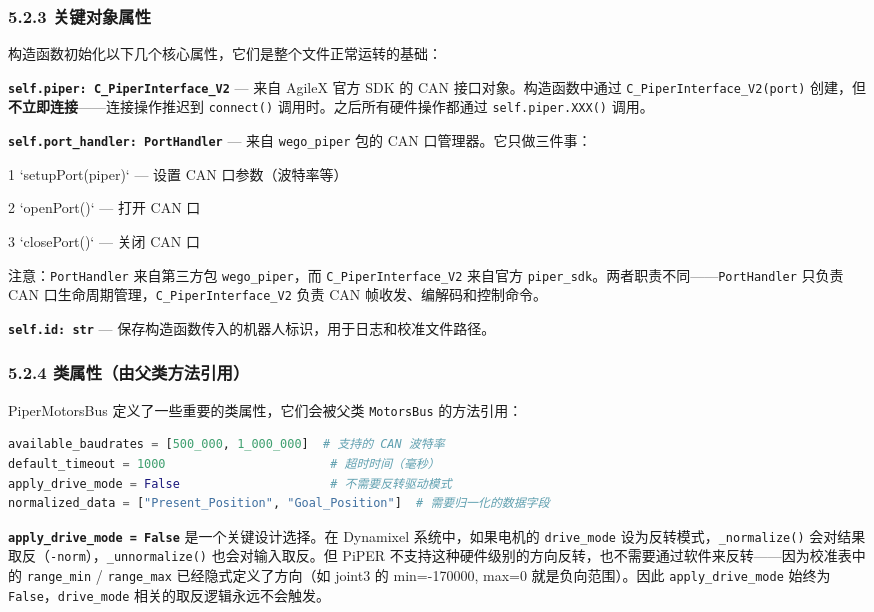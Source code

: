 \documentclass[UTF8,a4paper,11pt]{ctexart}
\begin{document}
\subsubsection{5.2.3 关键对象属性}

构造函数初始化以下几个核心属性，它们是整个文件正常运转的基础：

\textbf{\texttt{self.piper: C_PiperInterface_V2}} — 来自 AgileX 官方 SDK 的 CAN 接口对象。构造函数中通过 \texttt{C_PiperInterface_V2(port)} 创建，但\textbf{不立即连接}——连接操作推迟到 \texttt{connect()} 调用时。之后所有硬件操作都通过 \texttt{self.piper.XXX()} 调用。

\textbf{\texttt{self.port_handler: PortHandler}} — 来自 \texttt{wego_piper} 包的 CAN 口管理器。它只做三件事：
\item[1] `setupPort(piper)` — 设置 CAN 口参数（波特率等）
\item[2] `openPort()` — 打开 CAN 口
\item[3] `closePort()` — 关闭 CAN 口

注意：\texttt{PortHandler} 来自第三方包 \texttt{wego_piper}，而 \texttt{C_PiperInterface_V2} 来自官方 \texttt{piper_sdk}。两者职责不同——\texttt{PortHandler} 只负责 CAN 口生命周期管理，\texttt{C_PiperInterface_V2} 负责 CAN 帧收发、编解码和控制命令。

\textbf{\texttt{self.id: str}} — 保存构造函数传入的机器人标识，用于日志和校准文件路径。

\subsubsection{5.2.4 类属性（由父类方法引用）}

PiperMotorsBus 定义了一些重要的类属性，它们会被父类 \texttt{MotorsBus} 的方法引用：

\begin{lstlisting}[language=python]
available_baudrates = [500_000, 1_000_000]  # 支持的 CAN 波特率
default_timeout = 1000                       # 超时时间（毫秒）
apply_drive_mode = False                     # 不需要反转驱动模式
normalized_data = ["Present_Position", "Goal_Position"]  # 需要归一化的数据字段
\end{lstlisting}

\textbf{\texttt{apply_drive_mode = False}} 是一个关键设计选择。在 Dynamixel 系统中，如果电机的 \texttt{drive_mode} 设为反转模式，\texttt{_normalize()} 会对结果取反（\texttt{-norm}），\texttt{_unnormalize()} 也会对输入取反。但 PiPER 不支持这种硬件级别的方向反转，也不需要通过软件来反转——因为校准表中的 \texttt{range_min} / \texttt{range_max} 已经隐式定义了方向（如 joint3 的 min=-170000, max=0 就是负向范围）。因此 \texttt{apply_drive_mode} 始终为 \texttt{False}，\texttt{drive_mode} 相关的取反逻辑永远不会触发。
\end{document}
